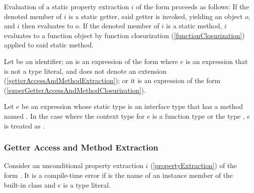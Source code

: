 \documentclass[makeidx]{article}
\begin{document}
{\LMHash{}%
Evaluation of a static property extraction $i$ of the form 
proceeds as follows:
If the denoted member of $i$ is a static getter,
said getter is invoked, yielding an object $o$,
and $i$ then evaluates to $o$.
If the denoted member of $i$ is a static method,
$i$ evaluates to a function object by function closurization
(\ref{functionClosurization})
applied to said static method.
\EndCase

\LMHash{}%
Let \id{} be an identifier;
an 
is an expression of the form 
where $e$ is an expression that is not a type literal,
and does not denote an extension
(\ref{getterAccessAndMethodExtraction});
or it is an expression of the form 
(\ref{superGetterAccessAndMethodClosurization}).
\EndCase

\LMHash{}%
Let $e$ be an expression whose static type is
an interface type that has a method named \CALL.
In the case where the context type for $e$ is a function type
or the type \FUNCTION,
$e$ is treated as .

\EndCase


\subsubsection{Getter Access and Method Extraction}

\LMHash{}%
Consider an unconditional property extraction $i$
(\ref{propertyExtraction})
of the form .
It is a compile-time error if \id{} is the name of
an instance member of the built-in class 
and $e$ is a type literal.



}
\end{document}
